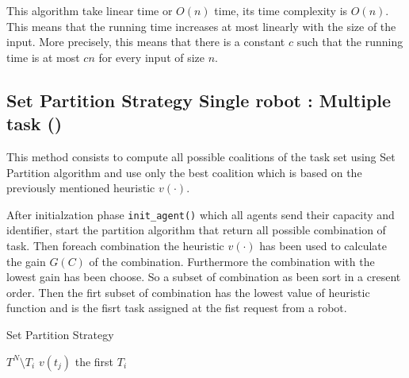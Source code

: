 



This algorithm take linear time or $O(n)$ time, its time complexity is $O(n)$.
This means that the running time increases at most linearly with the size of the input.
More precisely, this means that there is a constant $c$ such that the running time is 
at most $cn$ for every input of size $n$.

\subsection{Set Partition Strategy Single robot : Multiple task (\sps)}

This method consists to compute all possible coalitions of the task set 
using Set Partition algorithm \cite{partition} and use only 
the best coalition which is based on the previously mentioned heuristic $v(\cdot)$.

After initialzation phase \texttt{init\_agent()} which all agents send their capacity and identifier,
start the partition algorithm \cite{partition} that return all possible combination 
of task.
Then foreach combination the heuristic $v(\cdot)$ has been used to calculate the gain $G(C)$ of the 
combination. Furthermore the combination with the lowest gain has been choose.
So a subset of combination as been sort in a cresent order. 
Then the firt subset of combination has the lowest value of heuristic function and 
is the fisrt task assigned at the fist request from a robot.

\begin{algorithm}
  \caption{Set Partition Strategy} \label{SP}
  \begin{algorithmic}[1]
  \State {}
  $T^N \setminus T_i$
  \EndIf
      $v(t_j)$ 
    \EndFor
  \EndFor
   the first $T_i$
  \EndProcedure
  \end{algorithmic}
\end{algorithm}

